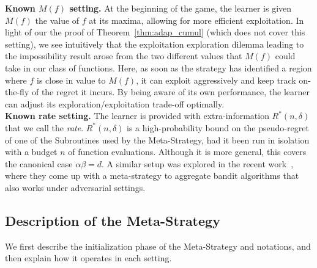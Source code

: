 \documentclass[final,12pt]{colt2018}
\begin{document}
\textbf{Known $M(f)$ setting.} At the beginning of the game, the learner is given $M(f)$ the value of $f$ at its maxima, allowing for more efficient exploitation. In light of our the proof of Theorem~\ref{thm:adap_cumul} (which does not cover this setting), we see intuitively that the exploitation exploration dilemma leading to the impossibility result arose from the two different values that $M(f)$ could take in our class of functions. Here, as soon as the strategy has identified a region where $f$ is close in value to $M(f)$, it can exploit aggressively and keep track on-the-fly of the regret it incurs. By being aware of its own performance, the learner can adjust its exploration/exploitation trade-off optimally.\\

\textbf{Known rate setting.} The learner is provided with extra-information $R^*(n,\delta)$ that we call the \emph{rate}. $R^*(n,\delta)$ is a high-probability bound on the pseudo-regret of one of the Subroutines used by the Meta-Strategy, had it been run in isolation with a budget $n$ of function evaluations. Although it is more general, this covers the canonical case $\alpha\beta = d$. A similar setup was explored in the recent work~\cite{agarwal2016corralling}, where they come up with a meta-strategy to aggregate bandit algorithms that also works under adversarial settings.

\subsection{Description of the Meta-Strategy}
We first describe the initialization phase of the Meta-Strategy and notations, and then explain how it operates in each setting.\\
\setlength{\textfloatsep}{5pt}
\end{document}
